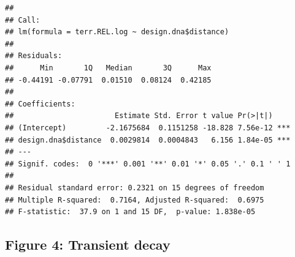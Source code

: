 \documentclass[]{article}
\newenvironment{Shaded}{\begin{snugshade}}{\end{snugshade}}
\newcommand{\KeywordTok}[1]{\textcolor[rgb]{0.13,0.29,0.53}{\textbf{#1}}}
\newcommand{\DecValTok}[1]{\textcolor[rgb]{0.00,0.00,0.81}{#1}}
\newcommand{\StringTok}[1]{\textcolor[rgb]{0.31,0.60,0.02}{#1}}
\newcommand{\OperatorTok}[1]{\textcolor[rgb]{0.81,0.36,0.00}{\textbf{#1}}}
\newcommand{\NormalTok}[1]{#1}
\begin{document}
\begin{Shaded}
\end{Shaded}

\begin{verbatim}
## 
## Call:
## lm(formula = terr.REL.log ~ design.dna$distance)
## 
## Residuals:
##      Min       1Q   Median       3Q      Max 
## -0.44191 -0.07791  0.01510  0.08124  0.42185 
## 
## Coefficients:
##                       Estimate Std. Error t value Pr(>|t|)    
## (Intercept)         -2.1675684  0.1151258 -18.828 7.56e-12 ***
## design.dna$distance  0.0029814  0.0004843   6.156 1.84e-05 ***
## ---
## Signif. codes:  0 '***' 0.001 '**' 0.01 '*' 0.05 '.' 0.1 ' ' 1
## 
## Residual standard error: 0.2321 on 15 degrees of freedom
## Multiple R-squared:  0.7164, Adjusted R-squared:  0.6975 
## F-statistic:  37.9 on 1 and 15 DF,  p-value: 1.838e-05
\end{verbatim}

\begin{Shaded}
\end{Shaded}

\subsection{Figure 4: Transient decay}\label{figure-4-transient-decay}
\end{document}

